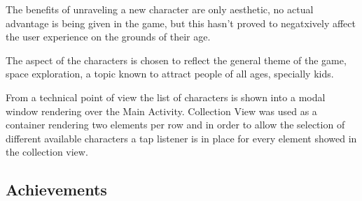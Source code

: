 \documentclass[12 pct]{report}
\begin{document}
The benefits of unraveling a new character are only aesthetic, no actual advantage is being given in the game, but this hasn't proved to negatxively affect the user experience on the grounds of their age.

The aspect of the characters is chosen to reflect the general theme of the game, space exploration, a topic known to attract people of all ages, specially kids.

From a technical point of view the list of characters is shown into a modal window rendering over the Main Activity. Collection View was used as a container rendering two elements per row and in order to allow the selection of different available characters a tap listener is in place for every element showed in the collection view.

\subsection*{Achievements}
 
\end{document}
